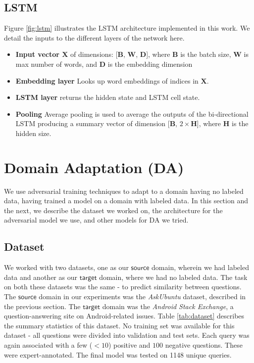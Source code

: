 \documentclass{sigkddExp}
\begin{document}
\subsection{LSTM}
Figure \ref{fig:lstm} illustrates the LSTM architecture implemented in this work. We detail the inputs to the different layers of the network here.
\begin{itemize}[topsep=0pt,itemsep=-1ex,partopsep=1ex,parsep=1ex]
\item \textbf{Input vector $\mathbf{X}$} of dimensions: [$\mathbf{B}$, $\mathbf{W}$, $\mathbf{D}$], where $\mathbf{B}$ is the batch size, $\mathbf{W}$ is max number of words, and $\mathbf{D}$ is the embedding dimension
\item \textbf{Embedding layer} Looks up word embeddings of indices in $\mathbf{X}$.
\item \textbf{LSTM layer} returns the hidden state and LSTM cell state.
\item \textbf{Pooling} Average pooling is used to average the outputs of the bi-directional LSTM producing a summary vector of dimension [$\mathbf{B}$, $2\times \mathbf{H}$], where $\mathbf{H}$ is the hidden size. 
\end{itemize}


\section{Domain Adaptation (DA)}
\label{domain_adapt}
 We use adversarial training techniques \cite{ganin2015unsupervised} to adapt to a domain having no labeled data, having trained a model on a domain with labeled data. In this section and the next, we describe the dataset we worked on, the architecture for the adversarial model we use, and other models for DA we tried.


\subsection{Dataset}
We worked with two datasets, one as our $\mathsf{source}$ domain, wherein we had labeled data and another as our $\mathsf{target}$ domain, where we had no labeled data. The task on both these datasets was the same - to predict similarity between questions. The $\mathsf{source}$ domain in our experiments was the \textit{AskUbuntu} dataset, described in the previous section. The $\mathsf{target}$ domain was the \textit{Android Stack Exchange}, a question-answering site on Android-related issues. Table \ref{tab:dataset} describes the summary statistics of this dataset. No training set was available for this dataset - all questions were divided into validation and test sets. Each query was again associated with a few ($<10$) positive and $100$ negative questions. These were expert-annotated. The final model was tested on 1148 unique queries.
\end{document}
